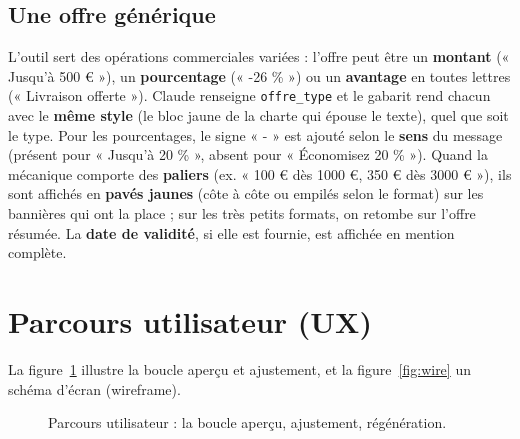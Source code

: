 \documentclass[11pt,a4paper]{article}
\begin{document}
\subsection{Une offre générique}
L'outil sert des opérations commerciales variées : l'offre peut être un
\textbf{montant} (« Jusqu'à 500 € »), un \textbf{pourcentage} (« -26 \% ») ou un
\textbf{avantage} en toutes lettres (« Livraison offerte »). Claude renseigne
\texttt{offre\_type} et le gabarit rend chacun avec le \textbf{même style} (le bloc
jaune de la charte qui épouse le texte), quel que soit le type. Pour les pourcentages,
le signe « - » est ajouté selon le \textbf{sens} du message (présent pour « Jusqu'à
20 \% », absent pour « Économisez 20 \% »). Quand la mécanique comporte des
\textbf{paliers} (ex. « 100 € dès 1000 €, 350 € dès 3000 € »), ils sont affichés en
\textbf{pavés jaunes} (côte à côte ou empilés selon le format) sur les bannières qui
ont la place ; sur les très petits formats, on retombe sur l'offre résumée. La
\textbf{date de validité}, si elle est fournie, est affichée en mention complète.

\section{Parcours utilisateur (UX)}
La figure~\ref{fig:flow} illustre la boucle aperçu et ajustement, et la
figure~\ref{fig:wire} un schéma d'écran (wireframe).

\begin{figure}[h]
\centering
{}
\caption{Parcours utilisateur : la boucle aperçu, ajustement, régénération.}
\label{fig:flow}
\end{figure}
\end{document}
